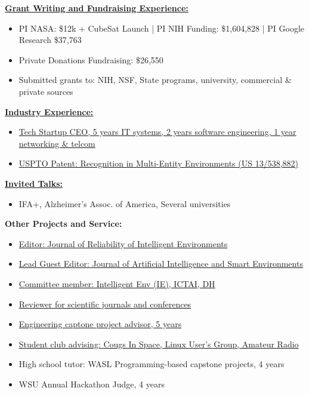 {\bf \hyperref[sec:support]{Grant Writing and Fundraising Experience:}}
\begin{itemize}
	\item PI NASA: \$12k + CubeSat Launch | PI NIH Funding: \$1,604,828 | PI Google Research \$37,763
	\item Private Donations Fundraising: \$26,550
	\item Submitted grants to: NIH, NSF, State programs, university, commercial \& private sources
\end{itemize}

{\bf \hyperref[sec:professionalexperience]{Industry Experience:}}
\begin{itemize}
	\item \hyperref[sec:professionalexperience]{Tech Startup CEO, 5 years IT systems, 2 years software engineering, 1 year networking \& telcom}
	\item \hyperref[sec:patents]{USPTO Patent: Recognition in Multi-Entity Environments (US 13/538,882)}
\end{itemize}

{\bf \hyperref[sec:invitedtalks]{Invited Talks:}}
\begin{itemize}
	\item IFA+, Alzheimer's Assoc. of America, Several universities
\end{itemize}

{\bf Other Projects and Service:}
\begin{itemize}
	\item \hyperref[sec:communitydevelopment]{Editor: Journal of Reliability of Intelligent Environments}
	\item \hyperref[sec:communitydevelopment]{Lead Guest Editor: Journal of Artificial Intelligence and Smart Environments}
	\item \hyperref[sec:communitydevelopment]{Committee member: Intelligent Env (IE), ICTAI, DH}
	\item \hyperref[sec:reviewing]{Reviewer for scientific journals and conferences}
	\item \hyperref[sec:departmentservice]{Engineering captone project advisor, 5 years}
	\item \hyperref[sec:departmentservice]{Student club advising: Cougs In Space, Linux User's Group, Amateur Radio}
	\item High school tutor: WASL Programming-based capstone projects, 4 years
	\item WSU Annual Hackathon Judge, 4 years
\end{itemize}

